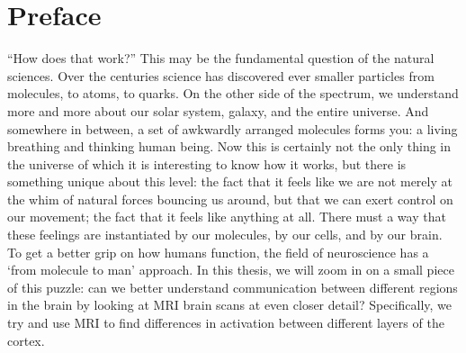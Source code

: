 \section*{Preface}
``How does that work?'' This may be the fundamental question of the natural sciences.
Over the centuries science has discovered ever smaller particles from molecules, to atoms, to quarks. On the other side of the spectrum, we understand more and more about our solar system, galaxy, and the entire universe. And somewhere in between, a set of awkwardly arranged molecules forms you: a living breathing and thinking human being.
Now this is certainly not the only thing in the universe of which it is interesting to know how it works, but there is something unique about this level: the fact that it feels like we are not merely at the whim of natural forces bouncing us around, but that we can exert control on our movement; the fact that it feels like anything at all. There must a way that these feelings are instantiated by our molecules, by our cells, and by our brain.
To get a better grip on how humans function, the field of neuroscience has a `from molecule to man' approach. In this thesis, we will zoom in on a small piece of this puzzle: can we better understand communication between different regions in the brain by looking at MRI brain scans at even closer detail? Specifically, we try and use MRI to find differences in activation between different layers of the cortex.
